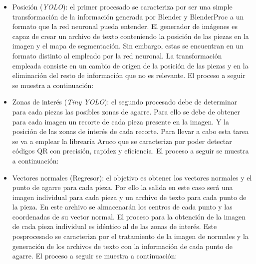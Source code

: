 \begin{itemize}
\item Posición (\textit{YOLO}): el primer procesado se caracteriza por ser una simple transformación de la información generada por Blender y BlenderProc a un formato que la red neuronal pueda entender. El generador de imágenes es capaz de crear un archivo de texto conteniendo la posición de las piezas en la imagen y el mapa de segmentación. Sin embargo, estas se encuentran en un formato distinto al empleado por la red neuronal. La transformación empleada consiste en un cambio de origen de la posición de las piezas y en la eliminación del resto de información que no es relevante. El proceso a seguir se muestra a continuación:
\vspace{5 mm}

\vspace{5 mm}

\item Zonas de interés (\textit{Tiny YOLO}): el segundo procesado debe de determinar para cada piezas las posibles zonas de agarre. Para ello se debe de obtener para cada imagen un recorte de cada pieza presente en la imagen. Y la posición de las zonas de interés de cada recorte. Para llevar a cabo esta tarea se va a emplear la librearía Aruco que se caracteriza por poder detectar códigos QR con precisión, rapidez y eficiencia. El proceso a seguir se muestra a continuación:
\vspace{5 mm}

\vspace{5 mm}

\item Vectores normales (Regresor): el objetivo es obtener los vectores normales y el punto de agarre para cada pieza. Por ello la salida en este caso será una imagen individual para cada pieza y un archivo de texto para cada punto de la pieza. En este archivo se almacenarán los centros de cada punto y las coordenadas de su vector normal. El proceso para la obtención de la imagen de cada pieza individual es idéntico al de las zonas de interés. Este posprocesado se caracteriza por el tratamiento de la imagen de normales y la generación de los archivos de texto con la información de cada punto de agarre. El proceso a seguir se muestra a continuación:
\vspace{5 mm}

\vspace{5 mm}

\end{itemize}


